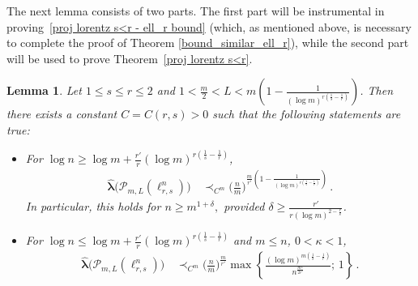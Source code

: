 \documentclass[12pt]{amsart}
\numberwithin{subsection}{section}
\newtheorem{lemma}[theorem]{Lemma}
\theoremstyle{definition}
\theoremstyle{remark}
\begin{document}
The next lemma consists of two parts. The first part will be instrumental in proving~\eqref{proj lorentz s<r - ell_r bound}
(which, as mentioned above, is necessary to complete the proof of Theorem \ref{bound_similar_ell_r}), while the second part
will be used to prove Theorem~\ref{proj lorentz s<r}.


\begin{lemma}\label{lem: second bound for middle L}
Let $1 \leq s \leq r \leq 2$ and $1<\frac{m}{2}<L<m\left(1-\frac{1}{(\log m)^{r(\frac1{s}-\frac1{r})}}\right)$. Then there
exists a constant $C=C(r,s)>0$ such that the following statements are true{\rm:}
\begin{itemize}
\item[(i)] For $ \log n \ge \log m + \frac{r'}{r}(\log m)^{r(\frac1{s}-\frac1{r})}$,
\begin{align*}
\widehat{\boldsymbol{\lambda}}\big(\mathcal P_{m,L}(\ell_{r,s}^n)\big)\,&\prec_{C^m} \Big(\frac{n}{m}\Big)^{\frac{m}{r'}\left(1-\frac1{(\log m)^{r(\frac1{s}-\frac1{r})}}\right)}\,.
\end{align*}
In particular, this holds for $n\ge m^{1+\delta},$ provided $\delta\ge \frac{r'}{r(\log m)^{2-\frac{r}{s}}}$.
\item[(ii)] For $ \log n \le \log m + \frac{r'}{r}(\log m)^{r(\frac1{s}-\frac1{r})}$ and  $ m\le n$, $0<\kappa<1$,
\begin{align*}
\widehat{\boldsymbol{\lambda}}\big(\mathcal P_{m,L}(\ell_{r,s}^n)\big)  \, &\prec_{C^m}\Big(\frac{n}{m}\Big)^{\frac{m}{r'}}\max\left\{\frac{(\log m)^{m(\frac1{s}-\frac1{r})}}{n^{\frac{m^\kappa}{2r'}}};\,1\right\}\,.
\end{align*}
\end{itemize}
\end{lemma}
\end{document}
